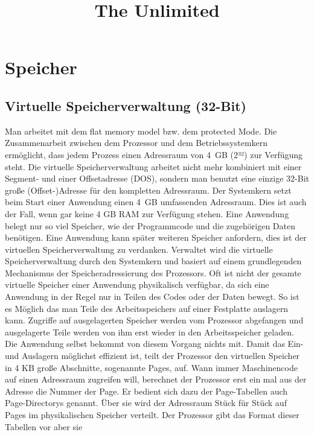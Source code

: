 \documentclass[12pt]{book}
\begin{document}
\title{The Unlimited}
\maketitle

\chapter{Speicher}

\section{Virtuelle Speicherverwaltung (32-Bit)}
Man arbeitet mit dem flat memory model bzw. dem protected Mode. Die
Zusammenarbeit zwischen dem Prozessor und dem Betriebssystemkern ermöglicht,
dass jedem Prozess einen Adressraum von 4 GB (2³²) zur Verfügung steht. Die
virtuelle Speicherverwaltung arbeitet nicht mehr kombiniert mit einer Segment-
und einer Offsetadresse (DOS), sondern man benutzt eine einzige 32-Bit große
(Offset-)Adresse für den kompletten Adressraum. Der Systemkern setzt beim Start
einer Anwendung einen 4 GB umfassenden Adressraum. Dies ist auch der Fall, wenn
gar keine 4 GB RAM zur Verfügung stehen. Eine Anwendung belegt nur so viel
Speicher, wie der Programmcode und die zugehörigen Daten benötigen. Eine
Anwendung kann später weiteren Speicher anfordern, dies ist der virtuellen
Speicherverwaltung zu verdanken. Verwaltet wird die virtuelle Speicherverwaltung
durch den Systemkern und basiert auf einem grundlegenden Mechanismus der
Speicheradressierung des Prozessors. Oft ist nicht der gesamte virtuelle
Speicher einer Anwendung physikalisch verfügbar, da sich eine Anwendung in der
Regel nur in Teilen des Codes oder der Daten bewegt. So ist es Möglich das man
Teile des Arbeitsspeichers auf einer Festplatte auslagern kann. Zugriffe auf
ausgelagerten Speicher werden vom Prozessor abgefangen und ausgelagerte Teile
werden von ihm erst wieder in den Arbeitsspeicher geladen. Die Anwendung selbst
bekommt von diesem Vorgang nichts mit. Damit das Ein- und Auslagern möglichst
effizient ist, teilt der Prozessor den virtuellen Speicher in 4 KB große
Abschnitte, sogenannte Pages, auf. Wann immer Maschinencode auf einen Adressraum
zugreifen will, berechnet der Prozessor erst ein mal aus der Adresse die Nummer
der Page. Er bedient sich dazu der Page-Tabellen auch Page-Directorys genannt.
Über sie wird der Adressraum Stück für Stück auf Pages im physikalischen
Speicher verteilt. Der Prozessor gibt das Format dieser Tabellen vor aber sie
\end{document}
